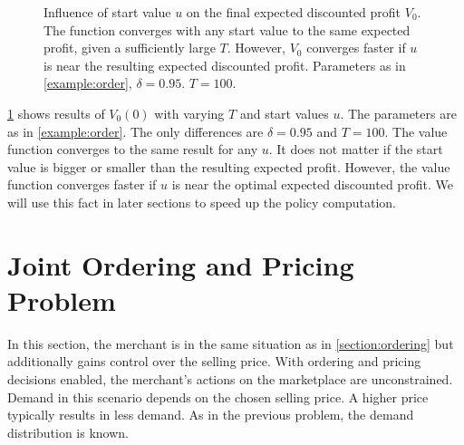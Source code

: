 \begin{figure}[t]
	\caption[Effect of Start Value on Convergence of Value Function]{Influence of start value $u$ on the final expected discounted profit $V_0$. The function converges with any start value to the same expected profit, given a sufficiently large $T$. However, $V_0$ converges faster if $u$ is near the resulting expected discounted profit. Parameters as in \cref{example:order}, $\delta=0.95$. $T=100$.}
	\label{fig:convergence}
\end{figure}

\cref{fig:convergence} shows results of $V_0(0)$ with varying $T$ and start values $u$.
The parameters are as in \cref{example:order}.
The only differences are $\delta = 0.95$ and $T = 100$.
The value function converges to the same result for any $u$.
It does not matter if the start value is bigger or smaller than the resulting expected profit.
However, the value function converges faster if $u$ is near the optimal expected discounted profit.
We will use this fact in later sections to speed up the policy computation.


\section{Joint Ordering and Pricing Problem}
\label{section:joint_ordering_pricing}
In this section, the merchant is in the same situation as in \cref{section:ordering} but additionally gains control over the selling price.
With ordering and pricing decisions enabled, the merchant's actions on the marketplace are unconstrained.
Demand in this scenario depends on the chosen selling price.
A higher price typically results in less demand.
As in the previous problem, the demand distribution is known.

